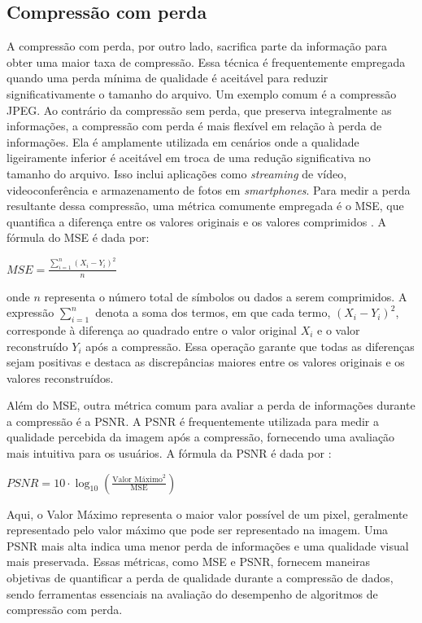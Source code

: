 \subsection{Compressão com perda}
A compressão com perda, por outro lado, sacrifica parte da informação para obter uma maior taxa de compressão. Essa técnica é frequentemente empregada quando uma perda mínima de qualidade é aceitável para reduzir significativamente o tamanho do arquivo. Um exemplo comum é a compressão \acrshort{JPEG}. Ao contrário da compressão sem perda, que preserva integralmente as informações, a compressão com perda é mais flexível em relação à perda de informações. Ela é amplamente utilizada em cenários onde a qualidade ligeiramente inferior é aceitável em troca de uma redução significativa no tamanho do arquivo. Isso inclui aplicações como \textit{streaming} de vídeo, videoconferência e armazenamento de fotos em \textit{smartphones}. Para medir a perda resultante dessa compressão, uma métrica comumente empregada é o \acrfull{MSE}, que quantifica a diferença entre os valores originais e os valores comprimidos \cite{compressionTechniquesElakkiya}. A fórmula do \acrshort{MSE} é dada por:
\begin{center}
    \(\displaystyle MSE = \frac{\sum_{i=1}^{n} (X_i - Y_i)^2}{n}\)
\end{center}
\BlankLine
\noindent onde $n$ representa o número total de símbolos ou dados a serem comprimidos. A expressão \( \sum_{i=1}^{n} \) denota a soma dos termos, em que cada termo, $(X_i - Y_i)^2$, corresponde à diferença ao quadrado entre o valor original $X_i$ e o valor reconstruído $Y_i$ após a compressão. Essa operação garante que todas as diferenças sejam positivas e destaca as discrepâncias maiores entre os valores originais e os valores reconstruídos.

Além do \acrshort{MSE}, outra métrica comum para avaliar a perda de informações durante a compressão é a \acrfull{PSNR}. A \acrshort{PSNR} é frequentemente utilizada para medir a qualidade percebida da imagem após a compressão, fornecendo uma avaliação mais intuitiva para os usuários. A fórmula da \acrshort{PSNR} é dada por \cite{compressionTechniquesElakkiya}:
\begin{center}
    \(\displaystyle PSNR = 10 \cdot \log_{10}\left(\frac{\text{Valor Máximo}^2}{\text{MSE}}\right)\)
\end{center}
\BlankLine
Aqui, o Valor Máximo representa o maior valor possível de um pixel, geralmente representado pelo valor máximo que pode ser representado na imagem. Uma PSNR mais alta indica uma menor perda de informações e uma qualidade visual mais preservada. Essas métricas, como \acrshort{MSE} e \acrshort{PSNR}, fornecem maneiras objetivas de quantificar a perda de qualidade durante a compressão de dados, sendo ferramentas essenciais na avaliação do desempenho de algoritmos de compressão com perda.

